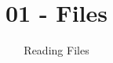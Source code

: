 \documentclass{beamer}
\title[1-Files]{01 - Files}
\subtitle{Reading Files}
\date{\hspace{1in}}
\institute[ISU]{Iowa State University}
\begin{document}
\begin{frame}
\maketitle
\end{frame}
\end{document}
